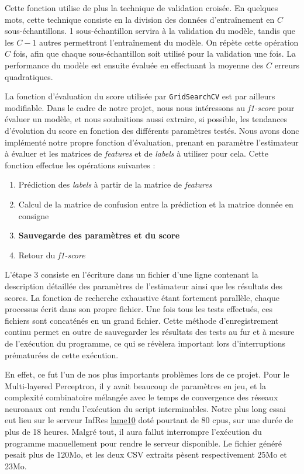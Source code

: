 \documentclass[a4paper]{report}
\begin{document}
Cette fonction utilise de plus la technique de validation croisée. En quelques mots, cette technique consiste en la division des données d'entraînement en $C$ sous-échantillons. 1 sous-échantillon servira à la validation du modèle, tandis que les $C-1$ autres permettront l'entraînement du modèle. On répète cette opération $C$ fois, afin que chaque sous-échantillon soit utilisé pour la validation une fois. La performance du modèle est ensuite évaluée en effectuant la moyenne des $C$ erreurs quadratiques.

La fonction d'évaluation du score utilisée par \texttt{GridSearchCV} est par ailleurs modifiable. Dans le cadre de notre projet, nous nous intéressons au \emph{f1-score} pour évaluer un modèle, et nous souhaitions aussi extraire, si possible, les tendances d'évolution du score en fonction des différents paramètres testés. Nous avons donc implémenté notre propre fonction d'évaluation, prenant en paramètre l'estimateur à évaluer et les matrices de \emph{features} et de \emph{labels} à utiliser pour cela. Cette fonction effectue les opérations suivantes :

\begin{enumerate}
\item Prédiction des \emph{labels} à partir de la matrice de \emph{features}
\item Calcul de la matrice de confusion entre la prédiction et la matrice donnée en consigne
\item \textbf{Sauvegarde des paramètres et du score}
\item Retour du \emph{f1-score}
\end{enumerate}

L'étape 3 consiste en l'écriture dans un fichier d'une ligne contenant la description détaillée des paramètres de l'estimateur ainsi que les résultats des scores. La fonction de recherche exhaustive étant fortement parallèle, chaque processus écrit dans son propre fichier. Une fois tous les tests effectués, ces fichiers sont concaténés en un grand fichier. Cette méthode d'enregistrement continu permet en outre de sauvegarder les résultats des tests au fur et à mesure de l'exécution du programme, ce qui se révèlera important lors d'interruptions prématurées de cette exécution.

En effet, ce fut l'un de nos plus importants problèmes lors de ce projet. Pour le Multi-layered Perceptron, il y avait beaucoup de paramètres en jeu, et la complexité combinatoire mélangée avec le temps de convergence des réseaux neuronaux ont rendu l'exécution du script interminables. Notre plus long essai eut lieu sur le serveur InfRes \href{http://lame10.enst.fr}{lame10} doté pourtant de 80 cpus, sur une durée de plus de 18 heures. Malgré tout, il aura fallut interrompre l'exécution du programme manuellement pour rendre le serveur disponible. Le fichier généré pesait plus de 120Mo, et les deux CSV extraits pèsent respectivement 25Mo et 23Mo.
\end{document}

